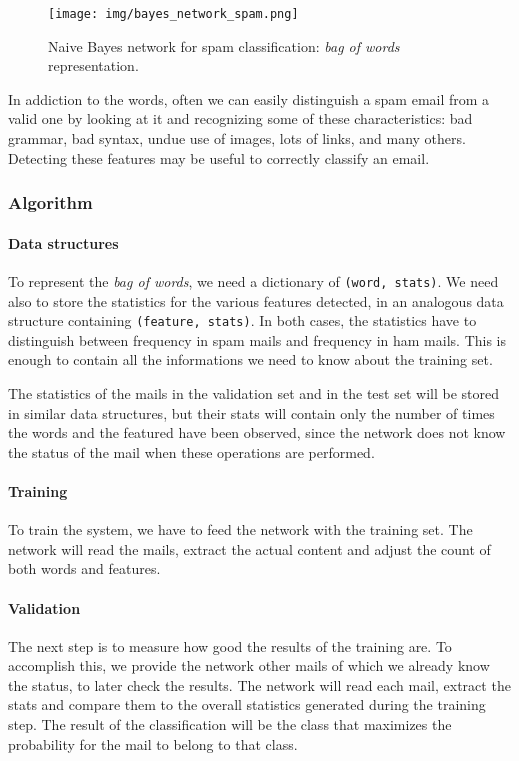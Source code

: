 \begin{figure}[h]
  \begin{center}
    \texttt{[image: img/bayes\_network\_spam.png]}
    \caption{Naive Bayes network for spam classification: \textit{bag of words} representation.}
    \label{fig:nbs}
  \end{center}
\end{figure}

In addiction to the words, often we can easily distinguish a spam email from a valid one by looking at it and recognizing some of these characteristics: bad grammar, bad syntax, undue use of images, lots of links, and many others. Detecting these features may be useful to correctly classify an email.

\subsubsection{Algorithm}
\paragraph{Data structures}
To represent the \textit{bag of words}, we need a dictionary of \verb!(word, stats)!. We need also to store the statistics for the various features detected, in an analogous data structure containing \verb!(feature, stats)!. In both cases, the statistics have to distinguish between frequency in spam mails and frequency in ham mails. This is enough to contain all the informations we need to know about the training set.

The statistics of the mails in the validation set and in the test set will be stored in similar data structures, but their stats will contain only the number of times the words and the featured have been observed, since the network does not know the status of the mail when these operations are performed.

\paragraph{Training}
To train the system, we have to feed the network with the training set. The network will read the mails, extract the actual content and adjust the count of both words and features.

\paragraph{Validation}
The next step is to measure how good the results of the training are. To accomplish this, we provide the network other mails of which we already know the status, to later check the results. The network will read each mail, extract the stats and compare them to the overall statistics generated during the training step. The result of the classification will be the class that maximizes the probability for the mail to belong to that class.

